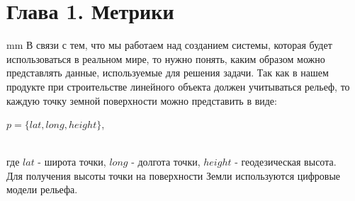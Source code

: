 \newpage
\section*{\LARGE{Глава 1. Метрики}}
 mm
В связи с тем, что мы работаем над созданием системы, которая будет использоваться в реальном мире, то нужно понять, каким образом можно представлять данные, используемые для решения задачи. Так как в нашем продукте при строительстве линейного объекта должен учитываться рельеф, то каждую точку земной поверхности можно представить в виде:\\
\centerline{ $p =\{lat, long, height\}$,}\\ 
где $lat$ - широта точки, $long$ - долгота точки, $height$ - геодезическая высота.\\
Для получения высоты точки на поверхности Земли используются цифровые модели рельефа.
